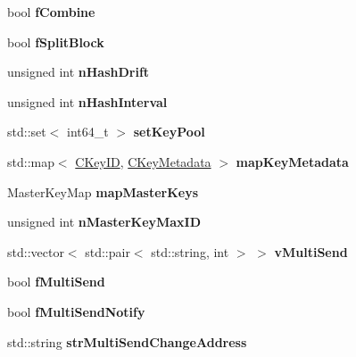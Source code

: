 \begin{DoxyCompactItemize}
bool {\bfseries f\+Combine}
\item 
\mbox{\label{class_c_wallet_a4c7cc72849459fc27762775efbede146}} 
bool {\bfseries f\+Split\+Block}
\item 
\mbox{\label{class_c_wallet_a44ee1b2e9ea4e3258ca7b1366f6b215a}} 
unsigned int {\bfseries n\+Hash\+Drift}
\item 
\mbox{\label{class_c_wallet_ab35577dacef10863f2c8623398341304}} 
unsigned int {\bfseries n\+Hash\+Interval}
\item 
\mbox{\label{class_c_wallet_a363fabb2b82d596c33e4fa3920a11c26}} 
std\+::set$<$ int64\+\_\+t $>$ {\bfseries set\+Key\+Pool}
\item 
\mbox{\label{class_c_wallet_acfd09bc5a2daee930f9f988efac8dbb7}} 
std\+::map$<$ \mbox{\hyperlink{class_c_key_i_d}{C\+Key\+ID}}, \mbox{\hyperlink{class_c_key_metadata}{C\+Key\+Metadata}} $>$ {\bfseries map\+Key\+Metadata}
\item 
\mbox{\label{class_c_wallet_a23c5badf56c297a95557af3073d4aa32}} 
Master\+Key\+Map {\bfseries map\+Master\+Keys}
\item 
\mbox{\label{class_c_wallet_aecfc6e4a6ea958ec369ca77d790271e3}} 
unsigned int {\bfseries n\+Master\+Key\+Max\+ID}
\item 
\mbox{\label{class_c_wallet_a8c8eda98d29dcf6220a922ee99dcd4e0}} 
std\+::vector$<$ std\+::pair$<$ std\+::string, int $>$ $>$ {\bfseries v\+Multi\+Send}
\item 
\mbox{\label{class_c_wallet_a8dacb7022870987a6810b63e0392c2fb}} 
bool {\bfseries f\+Multi\+Send}
\item 
\mbox{\label{class_c_wallet_a503e5719c1cc2cba7cc6c8ded780c5af}} 
bool {\bfseries f\+Multi\+Send\+Notify}
\item 
\mbox{\label{class_c_wallet_aacc3b001ea316cd1116a5defb86e262e}} 
std\+::string {\bfseries str\+Multi\+Send\+Change\+Address}
\item 

\end{DoxyCompactItemize}
